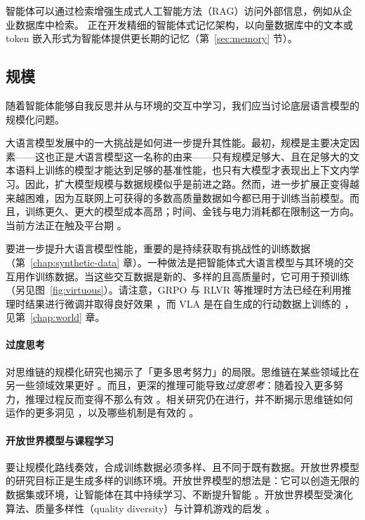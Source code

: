 智能体可以通过检索增强生成式人工智能方法（RAG）访问外部信息，例如从企业数据库中检索。
正在开发精细的智能体式记忆架构，以向量数据库中的文本或 token 嵌入形式为智能体提供更长期的记忆（第~\ref{sec:memory} 节）。

\subsection{规模}
随着智能体能够自我反思并从与环境的交互中学习，我们应当讨论底层语言模型的规模化问题。

大语言模型发展中的一大挑战是如何进一步提升其性能。最初，规模是主要决定因素——这也正是{\em 大}语言模型这一名称的由来——只有规模足够大、且在足够大的文本语料上训练的模型才能达到足够的基准性能，也只有大模型才表现出上下文内学习。因此，扩大模型规模与数据规模似乎是前进之路。然而，进一步扩展正变得越来越困难，因为互联网上可获得的多数高质量数据如今都已用于训练当前模型。而且，训练更久、更大的模型成本高昂；时间、金钱与电力消耗都在限制这一方向。当前方法正在触及平台期 \citep{sutskever2024}。

要进一步提升大语言模型性能，重要的是持续获取有挑战性的训练数据（第~\ref{chap:synthetic-data} 章）。一种做法是把智能体式大语言模型与其环境的交互用作训练数据。当这些交互数据是新的、多样的且高质量时，它可用于预训练（另见图~\ref{fig:virtuous}）。请注意，GRPO 与 RLVR 等推理时方法已经在利用推理时结果进行微调并取得良好效果 \citep{guo2025deepseek}，而 VLA 是在自生成的行动数据上训练的 \citep{black2024pi_0,brohan2023rt}，见第~\ref{chap:world} 章。

\paragraph{过度思考}
对思维链的规模化研究也揭示了「更多思考努力」的局限。思维链在某些领域比在另一些领域效果更好 \citep{sprague2024cot}。而且，更深的推理可能导致{\em 过度思考}：随着投入更多努力，推理过程反而变得不那么有效 \citep{liu2024mind,wu2025more}。相关研究仍在进行，并不断揭示思维链如何运作的更多洞见 \citep{chen2025does}，以及哪些机制是有效的 \citep{chen2026think}。

\paragraph{开放世界模型与课程学习}
要让规模化路线奏效，合成训练数据必须多样、且不同于既有数据。开放世界模型的研究目标正是生成多样的训练环境。开放世界模型的想法是：它可以创造无限的数据集或环境，让智能体在其中持续学习、不断提升智能 \citep{bruce2024genie}。开放世界模型受演化算法、质量多样性（quality diversity）与计算机游戏的启发 \citep{vinyals2019grandmaster,mouret2015illuminating,meta2022human}。

